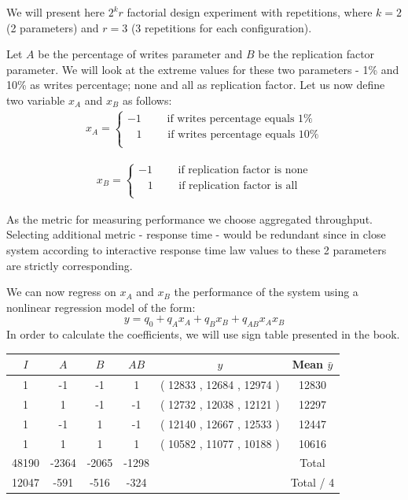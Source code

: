 \documentclass[11pt]{article}
\begin{document}
We will present here $2^kr$ factorial design experiment with repetitions, where $k = 2$ (2 parameters) and $r = 3$ (3 repetitions for each configuration).

Let $A$ be the percentage of writes parameter and $B$ be the replication factor parameter. We will look at the extreme values for these two parameters - 1\% and 10\% as writes percentage; none and all as replication factor. Let us now define two variable $x_A$ and $x_B$ as follows:
\begin{gather*}
x_A = 
\begin{cases}
-1 \qquad \text{ if writes percentage equals 1\%} \\ 
\;\;\;1 \qquad \text{ if writes percentage equals 10\%} \\ 
\end{cases}
\end{gather*}

\begin{gather*}
x_B = 
\begin{cases}
-1 \qquad \text{ if replication factor is none} \\ 
\;\;\;1 \qquad \text{ if replication factor is all} \\ 
\end{cases}
\end{gather*}

As the metric for measuring performance we choose aggregated throughput. Selecting additional metric - response time - would be redundant since in close system according to interactive response time law values to these 2 parameters are strictly corresponding.

We can now regress on $x_A$ and $x_B$ the performance of the system using a nonlinear regression model of the form:
$$y = q_0 + q_Ax_A + q_Bx_B + q_{AB}x_Ax_B$$
In order to calculate the coefficients, we will use sign table presented in the book.
\medskip

\begin{center}
\begin{tabular}{|c|c|c|c|c|c|}
\hline $I$ & $A$ & $B$ & $AB$ & $y$ &Mean $\bar{y}$ \\
\hline	1	&	-1	&	-1	&	1	&	(	12833	,	12684	,	12974	) &	12830	\\
\hline	1	&	1	&	-1	&	-1	&	(	12732	,	12038	,	12121	) &	12297	\\
\hline	1	&	-1	&	1	&	-1	&	(	12140	,	12667	,	12533	) &	12447	\\
\hline	1	&	1	&	1	&	1	&	(	10582	,	11077	,	10188	) &	10616	\\
\hline	48190	&	-2364	&	-2065	&	-1298	&							&	Total	\\
\hline	12047	&	-591	&	-516	&	-324	&							&	Total / 4	\\
\hline
\end{tabular}
\end{center}
\medskip
\end{document}
